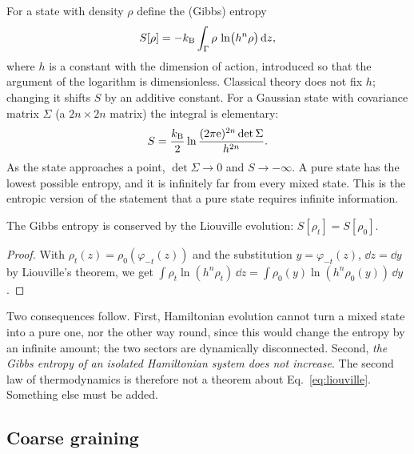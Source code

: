 For a state with density $\rho$ define the (Gibbs) entropy
\begin{equation}
S[\rho]=-k_{\mathrm B}\int_\Gamma\rho\,\ln\bigl(h^n\rho\bigr)\,\mathrm{d} z,
\label{eq:gibbs}
\end{equation}
where $h$ is a constant with the dimension of action, introduced so that the argument of the logarithm is dimensionless. Classical theory does not fix $h$; changing it shifts $S$ by an additive constant. For a Gaussian state with covariance matrix $\Sigma$ (a $2n\times2n$ matrix) the integral is elementary:
\begin{equation}
S=\frac{k_{\mathrm B}}{2}\ln\frac{(2\pi\mathrm{e})^{2n}\det\Sigma}{h^{2n}}.
\label{eq:gaussS}
\end{equation}
As the state approaches a point, $\det\Sigma\to0$ and $S\to-\infty$. A pure state has the lowest possible entropy, and it is infinitely far from every mixed state. This is the entropic version of the statement that a pure state requires infinite information.

\begin{proposition}\label{prop:entropy-invariant}
The Gibbs entropy is conserved by the Liouville evolution: $S[\rho_t]=S[\rho_0]$.
\end{proposition}

\begin{proof}
With $\rho_t(z)=\rho_0(\varphi_{-t}(z))$ and the substitution $y=\varphi_{-t}(z)$, $\dd z=\dd y$ by Liouville's theorem, we get $\int\rho_t\ln(h^n\rho_t)\,\dd z=\int\rho_0(y)\ln(h^n\rho_0(y))\,\dd y$.
\end{proof}

Two consequences follow. First, Hamiltonian evolution cannot turn a mixed state into a pure one, nor the other way round, since this would change the entropy by an infinite amount; the two sectors are dynamically disconnected. Second, \emph{the Gibbs entropy of an isolated Hamiltonian system does not increase}. The second law of thermodynamics is therefore not a theorem about Eq.~\eqref{eq:liouville}. Something else must be added.

\subsection{Coarse graining}

